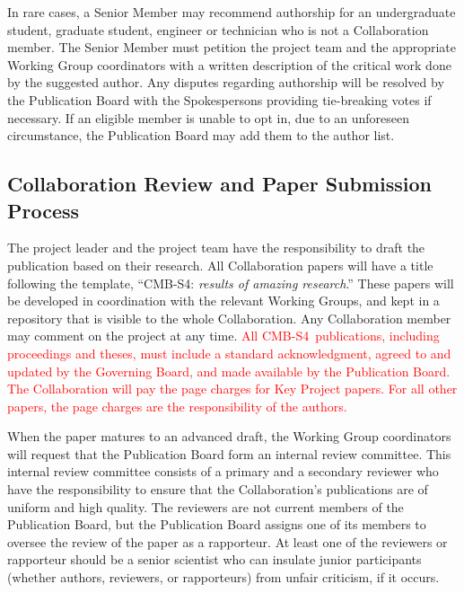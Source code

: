 \documentclass[12pt]{article}
\newcommand{\Comment}[1]{\textcolor{Blue}{(Comment: #1)}}
\newcommand\collabname{CMB-S4}
\newcommand{\revision}[1]{\textcolor{Red}{#1}}
\begin{document}
In rare cases, a Senior Member may recommend authorship for an undergraduate student, graduate student, engineer or technician who is not a Collaboration member.  The Senior Member must petition the project team and the appropriate Working Group coordinators with a written description of the critical work done by the suggested author. 
Any disputes regarding authorship will be resolved by the Publication Board with the Spokespersons providing  tie-breaking votes if necessary.  If an eligible member is unable to opt in, due to an unforeseen circumstance, the Publication Board may add them to the author list.

\subsection{Collaboration Review and Paper Submission Process}
 
The project leader and the project team have the responsibility to draft the publication based on their research.  All Collaboration papers will have a title following the template, ``\collabname: \textit{results of amazing research}.''  These papers will be developed in coordination with the relevant Working Groups, and kept in a repository that is visible to the whole Collaboration.  Any Collaboration member may comment on the project at any time.
\revision{
All \collabname\ publications, including proceedings and theses, must include a standard acknowledgment, agreed to and updated by the Governing Board, and made available by the Publication Board.  The Collaboration will pay the page charges for Key Project papers. For all other papers, the page charges are the responsibility of the authors.
}

When the paper matures to an advanced draft, the Working Group coordinators will request that the Publication Board form an internal review committee. This internal review committee consists of a primary and a secondary reviewer who have the responsibility to ensure that the Collaboration's publications are of uniform and high quality.  The reviewers are not current members of the Publication Board, but the Publication Board assigns one of its members to oversee the review of the paper as a rapporteur.  At least one of the reviewers or rapporteur should be a senior scientist who can insulate junior participants (whether authors, reviewers, or rapporteurs) from unfair criticism, if it occurs.
\end{document}
